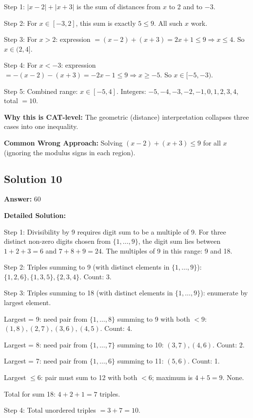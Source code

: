 \documentclass[11pt]{article}
\begin{document}
Step 1: \(|x-2|+|x+3|\) is the sum of distances from \(x\) to 2 and to \(-3\).

Step 2: For \(x \in [-3, 2]\), this sum is exactly \(5 \le 9\). All such \(x\) work.

Step 3: For \(x > 2\): expression \(= (x-2) + (x+3) = 2x+1 \le 9 \Rightarrow x \le 4\). So \(x \in (2, 4]\).

Step 4: For \(x < -3\): expression \(= -(x-2) - (x+3) = -2x - 1 \le 9 \Rightarrow x \ge -5\). So \(x \in [-5, -3)\).

Step 5: Combined range: \(x \in [-5, 4]\). Integers: \(-5, -4, -3, -2, -1, 0, 1, 2, 3, 4\), total \(= 10\).

\textbf{Why this is CAT-level:}
The geometric (distance) interpretation collapses three cases into one inequality.

\textbf{Common Wrong Approach:}
Solving \((x-2)+(x+3) \le 9\) for all \(x\) (ignoring the modulus signs in each region).

\subsection*{Solution 10}
\textbf{Answer:} \(60\)

\textbf{Detailed Solution:}

Step 1: Divisibility by 9 requires digit sum to be a multiple of 9. For three distinct non-zero digits chosen from \(\{1,\ldots,9\}\), the digit sum lies between \(1+2+3=6\) and \(7+8+9=24\). The multiples of 9 in this range: 9 and 18.

Step 2: Triples summing to 9 (with distinct elements in \(\{1,\ldots,9\}\)): \(\{1,2,6\}, \{1,3,5\}, \{2,3,4\}\). Count: 3.

Step 3: Triples summing to 18 (with distinct elements in \(\{1,\ldots,9\}\)): enumerate by largest element.

Largest = 9: need pair from \(\{1,\ldots,8\}\) summing to 9 with both \(< 9\): \((1,8),(2,7),(3,6),(4,5)\). Count: 4.

Largest = 8: need pair from \(\{1,\ldots,7\}\) summing to 10: \((3,7),(4,6)\). Count: 2.

Largest = 7: need pair from \(\{1,\ldots,6\}\) summing to 11: \((5,6)\). Count: 1.

Largest \(\le 6\): pair must sum to 12 with both \(< 6\); maximum is \(4+5 = 9\). None.

Total for sum 18: \(4 + 2 + 1 = 7\) triples.

Step 4: Total unordered triples \(= 3 + 7 = 10\).
\end{document}
